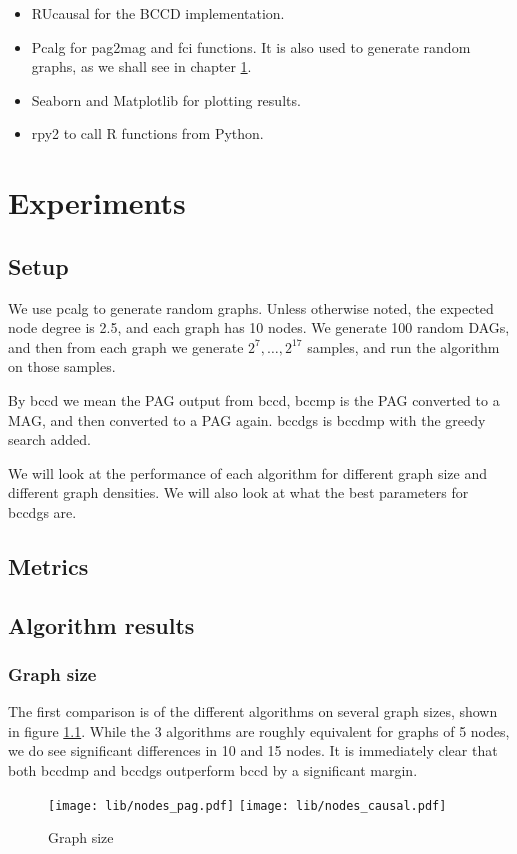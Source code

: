\documentclass[11pt,a4paper]{report}
\theoremstyle{definition}
\begin{document}
\begin{itemize}
  \item RUcausal  for the BCCD implementation.

  \item Pcalg\cite{kalischCausalInferenceUsing2012} for pag2mag and fci
    functions. It is also used to generate random graphs, as we shall see
    in chapter \ref{results}.

  \item Seaborn\cite{waskomSeabornStatisticalData2021} and
    Matplotlib\cite{hunterMatplotlib2DGraphics2007} for plotting results.

  \item rpy2 to call R functions from Python.
\end{itemize}

\chapter{Experiments}\label{results}

\section{Setup}
We use pcalg to generate random graphs. Unless otherwise noted, the
expected node degree is 2.5, and each graph has 10 nodes. We generate 100
random DAGs, and then from each graph we generate $2^7, \ldots, 2^{17}$
samples, and run the algorithm on those samples.

By bccd we mean the PAG output from bccd, bccmp is the PAG converted to a
MAG, and then converted to a PAG again. bccdgs is bccdmp with the greedy
search added.

We will look at the performance of each algorithm for different graph
size and different graph densities. We will also look at what the best
parameters for bccdgs are.

\section{Metrics}

\section{Algorithm results}

\subsection{Graph size}
The first comparison is of the different algorithms on several graph
sizes, shown in figure \ref{fig:nodes_causal}. While the 3 algorithms are
roughly equivalent for graphs of 5 nodes, we do see significant
differences in 10 and 15 nodes. It is immediately clear that both bccdmp
and bccdgs outperform bccd by a significant margin.
\begin{figure}
  \centering
  \texttt{[image: lib/nodes\_pag.pdf]}
  \texttt{[image: lib/nodes\_causal.pdf]}
  \caption{Graph size}
  \label{fig:nodes_causal}
\end{figure}
\end{document}
